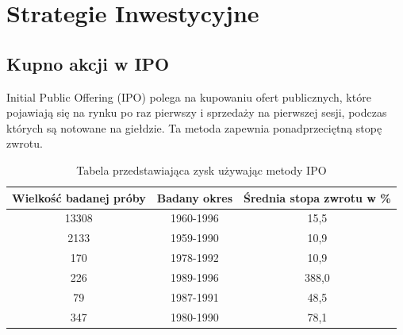 \documentclass{report}
\begin{document}
\chapter{Strategie Inwestycyjne}
\section{Kupno akcji w IPO}
Initial Public Offering\cite{perz2008sztuka} (IPO) polega na kupowaniu ofert publicznych, które pojawiają się na rynku po raz pierwszy i sprzedaży na pierwszej sesji, podczas których są notowane na giełdzie. Ta metoda zapewnia ponadprzeciętną stopę zwrotu.
\newline
\begin{table}[h]
\begin{tabular}{|c|c|c|} \hline
Wielkość badanej próby & Badany okres & Średnia stopa zwrotu w \% \\
\hline
13308 & 1960-1996 & 15,5 \\
\hline
2133 & 1959-1990 & 10,9 \\
\hline
170 & 1978-1992 & 10,9 \\
\hline
226 & 1989-1996 & 388,0 \\
\hline
79 & 1987-1991 & 48,5 \\
\hline
347 & 1980-1990 & 78,1 \\
\hline
\end{tabular}
\caption{Tabela przedstawiająca zysk używając metody IPO}
\end{table}
\end{document}
